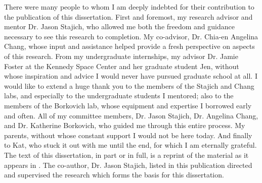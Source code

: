 \documentclass[11pt]{UCR_latex_template/ucr}
\begin{document}
\begin{frontmatter}
\begin{acknowledgements}
There were many people to whom I am deeply indebted for their contribution to the publication of this dissertation. First and foremost, my research advisor and mentor Dr. Jason Stajich, who allowed me both the freedom and guidance necessary to see this research to completion. My co-advisor, Dr. Chia-en Angelina Chang, whose input and assistance helped provide a fresh perspective on aspects of this research. From my undergraduate internships, my advisor Dr. Jamie Foster at the Kennedy Space Center and her graduate student Jen, without whose inspiration and advice I would never have pursued graduate school at all. I would like to extend a huge thank you to the members of the Stajich and Chang labs, and especially to the undergraduate students I mentored; also to the members of the Borkovich lab, whose equipment and expertise I borrowed early and often. All of my committee members, Dr. Jason Stajich, Dr. Angelina Chang, and Dr. Katherine Borkovich, who guided me through this entire process. My parents, without whose constant support I would not be here today. And finally to Kat, who stuck it out with me until the end, for which I am eternally grateful.\\
The text of this dissertation, in part or in full, is a reprint of the material as it appears in \cite{James2013}. The co-author, Dr. Jason Stajich, listed in this publication directed and supervised the research which forms the basis for this dissertation.\\
\end{acknowledgements}




\tableofcontents
\listoffigures
\listoftables
\end{frontmatter}
\end{document}
